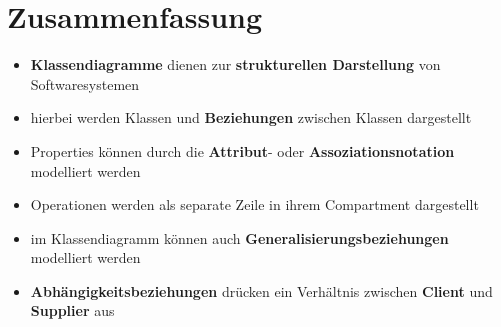 \section{Zusammenfassung}


\begin{itemize}
    \item \textbf{Klassendiagramme} dienen zur \textbf{strukturellen Darstellung} von Softwaresystemen
    \item hierbei werden Klassen und \textbf{Beziehungen} zwischen Klassen dargestellt
    \item Properties können durch die \textbf{Attribut}- oder \textbf{Assoziationsnotation} modelliert werden
    \item Operationen werden als separate Zeile in ihrem Compartment dargestellt
    \item im Klassendiagramm können auch \textbf{Generalisierungsbeziehungen} modelliert werden
    \item \textbf{Abhängigkeitsbeziehungen} drücken ein Verhältnis zwischen \textbf{Client} und \textbf{Supplier} aus
\end{itemize}
